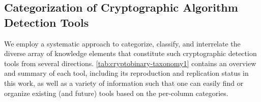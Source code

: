 






\subsection{Categorization of Cryptographic Algorithm Detection Tools}
\label{subsec:cryptobinary-tool_cat}

We employ a systematic approach to categorize, classify, and interrelate the diverse array of knowledge elements that constitute such cryptographic detection tools from several directions. \autoref{tab:cryptobinary-taxonomy1} contains an overview and summary of each tool, including its reproduction and replication status in this work, as well as a variety of information such that one can easily find or organize existing (and future) tools based on the per-column categories.

